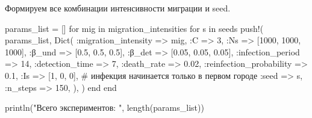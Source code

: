 \documentclass[
  12pt,
  a4paper,
  DIV=11,
  numbers=noendperiod]{scrreprt}
\newenvironment{Shaded}{\begin{snugshade}}{\end{snugshade}}
\newcommand{\CommentTok}[1]{\textcolor[rgb]{0.37,0.37,0.37}{#1}}
\newcommand{\ControlFlowTok}[1]{\textcolor[rgb]{0.00,0.23,0.31}{#1}}
\newcommand{\FloatTok}[1]{\textcolor[rgb]{0.68,0.00,0.00}{#1}}
\newcommand{\FunctionTok}[1]{\textcolor[rgb]{0.28,0.35,0.67}{#1}}
\newcommand{\KeywordTok}[1]{\textcolor[rgb]{0.00,0.23,0.31}{#1}}
\newcommand{\NormalTok}[1]{\textcolor[rgb]{0.00,0.23,0.31}{#1}}
\newcommand{\OperatorTok}[1]{\textcolor[rgb]{0.37,0.37,0.37}{#1}}
\newcommand{\StringTok}[1]{\textcolor[rgb]{0.13,0.47,0.30}{#1}}
\begin{document}
Формируем все комбинации интенсивности миграции и seed.

\begin{Shaded}
\begin{Highlighting}[]
\NormalTok{params\_list }\OperatorTok{=}\NormalTok{ []}
\ControlFlowTok{for}\NormalTok{ mig }\KeywordTok{in}\NormalTok{ migration\_intensities}
    \ControlFlowTok{for}\NormalTok{ s }\KeywordTok{in}\NormalTok{ seeds}
        \FunctionTok{push!}\NormalTok{(}
\NormalTok{            params\_list,}
            \FunctionTok{Dict}\NormalTok{(}
                \OperatorTok{:}\NormalTok{migration\_intensity }\OperatorTok{=\textgreater{}}\NormalTok{ mig,}
                \OperatorTok{:}\NormalTok{C }\OperatorTok{=\textgreater{}} \FloatTok{3}\NormalTok{,}
                \OperatorTok{:}\NormalTok{Ns }\OperatorTok{=\textgreater{}}\NormalTok{ [}\FloatTok{1000}\NormalTok{, }\FloatTok{1000}\NormalTok{, }\FloatTok{1000}\NormalTok{],}
                \OperatorTok{:}\NormalTok{β\_und }\OperatorTok{=\textgreater{}}\NormalTok{ [}\FloatTok{0.5}\NormalTok{, }\FloatTok{0.5}\NormalTok{, }\FloatTok{0.5}\NormalTok{],}
                \OperatorTok{:}\NormalTok{β\_det }\OperatorTok{=\textgreater{}}\NormalTok{ [}\FloatTok{0.05}\NormalTok{, }\FloatTok{0.05}\NormalTok{, }\FloatTok{0.05}\NormalTok{],}
                \OperatorTok{:}\NormalTok{infection\_period }\OperatorTok{=\textgreater{}} \FloatTok{14}\NormalTok{,}
                \OperatorTok{:}\NormalTok{detection\_time }\OperatorTok{=\textgreater{}} \FloatTok{7}\NormalTok{,}
                \OperatorTok{:}\NormalTok{death\_rate }\OperatorTok{=\textgreater{}} \FloatTok{0.02}\NormalTok{,}
                \OperatorTok{:}\NormalTok{reinfection\_probability }\OperatorTok{=\textgreater{}} \FloatTok{0.1}\NormalTok{,}
                \OperatorTok{:}\NormalTok{Is }\OperatorTok{=\textgreater{}}\NormalTok{ [}\FloatTok{1}\NormalTok{, }\FloatTok{0}\NormalTok{, }\FloatTok{0}\NormalTok{],  }\CommentTok{\# инфекция начинается только в первом городе}
                \OperatorTok{:}\NormalTok{seed }\OperatorTok{=\textgreater{}}\NormalTok{ s,}
                \OperatorTok{:}\NormalTok{n\_steps }\OperatorTok{=\textgreater{}} \FloatTok{150}\NormalTok{,}
\NormalTok{            ),}
\NormalTok{        )}
    \ControlFlowTok{end}
\ControlFlowTok{end}

\FunctionTok{println}\NormalTok{(}\StringTok{"Всего экспериментов: "}\NormalTok{, }\FunctionTok{length}\NormalTok{(params\_list))}
\end{Highlighting}
\end{Shaded}
\end{document}

